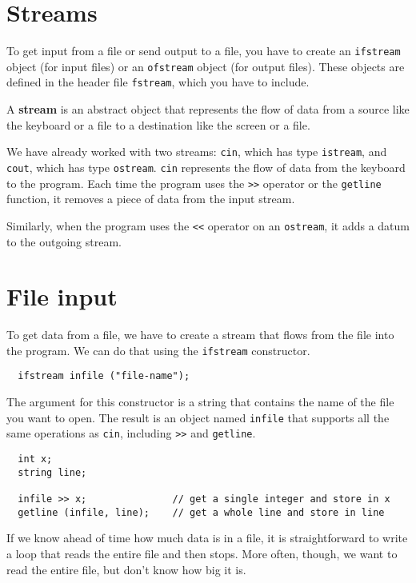 \section {Streams}

To get input from a file or send output to a file, you have to
create an {\tt ifstream} object (for input files) or an
{\tt ofstream} object (for output files).  These objects
are defined in the header file {\tt fstream}, which you
have to include.


A {\bf stream} is an abstract object that represents the flow
of data from a source like the keyboard or a file to a destination
like the screen or a file.

We have already worked with two streams: {\tt cin}, which has type
{\tt istream}, and {\tt cout}, which has type {\tt ostream}.
{\tt cin} represents the flow of data from the keyboard to
the program.  Each time the program uses the {\tt >>} operator
or the {\tt getline} function, it removes a piece of data
from the input stream.


Similarly, when the program uses the {\tt <<} operator on
an {\tt ostream}, it adds a datum to the outgoing stream.

\section {File input}
\label{finput}

To get data from a file, we have to create a stream that flows
from the file into the program.  
We can do that using the {\tt ifstream} constructor.

\begin{verbatim}
  ifstream infile ("file-name");
\end{verbatim}
%
The argument for this constructor is a string that
contains the name of the file you want to open.  The result
is an object named {\tt infile} that supports all the same
operations as {\tt cin}, including {\tt >>} and {\tt getline}.

\begin{verbatim}
  int x;
  string line;
    
  infile >> x;               // get a single integer and store in x
  getline (infile, line);    // get a whole line and store in line
\end{verbatim}
%
If we know ahead of time how much data is in a file, it is 
straightforward to write a loop that reads the entire file and
then stops.  More often, though, we want to read the entire
file, but don't know how big it is.

